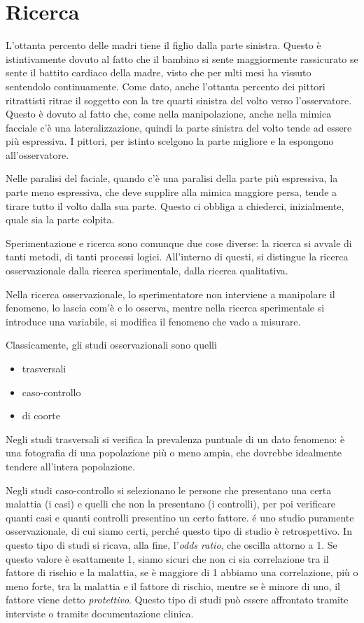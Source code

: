 \chapter{Ricerca}
L'ottanta percento delle madri tiene il figlio dalla parte sinistra. Questo è istintivamente dovuto al fatto che il bambino si sente maggiormente rassicurato se sente il battito cardiaco della madre, visto che per mlti mesi ha vissuto sentendolo continuamente. Come dato, anche l'ottanta percento dei pittori ritrattisti ritrae il soggetto con la tre quarti sinistra del volto verso l'osservatore. Questo è dovuto al fatto che, come nella manipolazione, anche nella mimica facciale c'è una lateralizzazione, quindi la parte sinistra del volto tende ad essere più espressiva. I pittori, per istinto scelgono la parte migliore e la espongono all'osservatore.

Nelle paralisi del faciale, quando c'è una paralisi della parte più espressiva, la parte meno espressiva, che deve supplire alla mimica maggiore persa, tende a tirare tutto il volto dalla sua parte. Questo ci obbliga a chiederci, inizialmente, quale sia la parte colpita.

Sperimentazione e ricerca sono comunque due cose diverse: la ricerca si avvale di tanti metodi, di tanti processi logici. All'interno di questi, si distingue la ricerca osservazionale dalla ricerca sperimentale, dalla ricerca qualitativa.

Nella ricerca osservazionale, lo sperimentatore non interviene a manipolare il fenomeno, lo lascia com'è e lo osserva, mentre nella ricerca sperimentale si introduce una variabile, si modifica il fenomeno che vado a misurare.

Classicamente, gli studi osservazionali sono quelli
\begin{itemize}
\item trasversali
\item caso-controllo
\item di coorte
\end{itemize}
Negli studi trasversali si verifica la prevalenza puntuale di un dato fenomeno: è una fotografia di una popolazione più o meno ampia, che dovrebbe idealmente tendere all'intera popolazione.

Negli studi caso-controllo si selezionano le persone che presentano una certa malattia (i casi) e quelli che non la presentano (i controlli), per poi verificare quanti casi e quanti controlli presentino un certo fattore. \'e uno studio puramente osservazionale, di cui siamo certi, perché questo tipo di studio è retrospettivo. In questo tipo di studi si ricava, alla fine, l'\textit{odds ratio}, che oscilla attorno a 1. Se questo valore è esattamente 1, siamo sicuri che non ci sia correlazione tra il fattore di rischio e la malattia, se è maggiore di 1 abbiamo una correlazione, più o meno forte, tra la malattia e il fattore di rischio, mentre se è minore di uno, il fattore viene detto \textit{protettivo}.
Questo tipo di studi può essere affrontato tramite interviste o tramite documentazione clinica.

